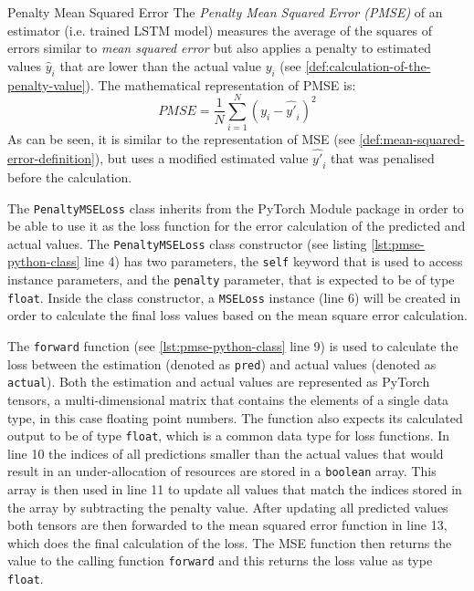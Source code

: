     \begin{pabox}{Penalty Mean Squared Error}
      \label{def:penalty-mean-squared-error-definition}
      The \emph{Penalty Mean Squared Error (PMSE)} of an estimator (i.e. trained LSTM model) measures the average of the squares of errors similar to \emph{mean squared error} but also applies a penalty to estimated values $\hat{y}_i$ that are lower than the actual value $y_i$ (see \ref{def:calculation-of-the-penalty-value}). 
      The mathematical representation of PMSE is:
      $$PMSE = \frac{1}{N} \sum_{i = 1}^{N}\left(y_i - \hat{y'}_i\right)^2$$
      As can be seen, it is similar to the representation of MSE (see \ref{def:mean-squared-error-definition}), but uses a modified estimated value $\hat{y'}_i$ that was penalised before the calculation.
    \end{pabox}

    The \texttt{PenaltyMSELoss} class inherits from the PyTorch Module package in order to be able to use it as the loss function for the error calculation of the predicted and actual values.
    The \texttt{PenaltyMSELoss} class constructor (see listing \ref{lst:pmse-python-class} line 4) has two parameters, the \texttt{self} keyword that is used to access instance parameters, and the \texttt{penalty} parameter, that is expected to be of type \texttt{float}.
    Inside the class constructor, a \texttt{MSELoss} instance (line 6) will be created in order to calculate the final loss values based on the mean square error calculation.

    

    The \texttt{forward} function (see \ref{lst:pmse-python-class} line 9) is used to calculate the loss between the estimation (denoted as \texttt{pred}) and actual values (denoted as \texttt{actual}). Both the estimation and actual values are represented as PyTorch tensors, a multi-dimensional matrix that contains the elements of a single data type, in this case floating point numbers.
    The function also expects its calculated output to be of type \texttt{float}, which is a common data type for loss functions.
    In line 10 the indices of all predictions smaller than the actual values that would result in an under-allocation of resources are stored in a \texttt{boolean} array.
    This array is then used in line 11 to update all values that match the indices stored in the array by subtracting the penalty value.
    After updating all predicted values both tensors are then forwarded to the mean squared error function in line 13, which does the final calculation of the loss.
    The MSE function then returns the value to the calling function \texttt{forward} and this returns the loss value as type \texttt{float}.




